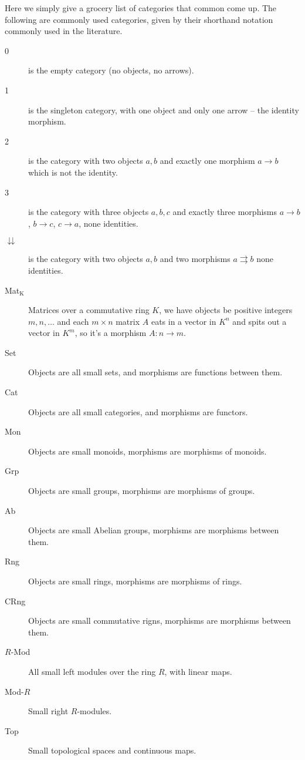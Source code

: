 Here we simply give a grocery list of categories that common come
up. The following are commonly used categories, given by their
shorthand notation commonly used in the literature.
\begin{description}
\item[0] is the empty category (no objects, no arrows).
\item[1] is the singleton category, with one object and only one
  arrow -- the identity morphism.
\item[2] is the category with two objects $a,b$ and exactly one
  morphism $a\to b$ which is not the identity.
\item[3] is the category with three objects $a,b,c$ and exactly
  three morphisms $a\to{}b$, $b\to{}c$, $c\to{}a$, none identities.
\item[$\downdownarrows$] is the category with two objects $a,b$ and
  two morphisms $a\rightrightarrows{}b$ none identities.
\item[Mat$_\text{K}$] Matrices over a commutative ring $K$, we
  have objects be positive integers $m,n,\ldots$ and each
  $m\times n$ matrix $A$ eats in a vector in $K^n$ and spits out
  a vector in $K^m$, so it's a morphism $A:n\to m$.
\item[Set] Objects are all small sets, and morphisms are
  functions between them.
\item[Cat] Objects are all small categories, and morphisms are
  functors.
\item[Mon] Objects are small monoids, morphisms are morphisms of monoids.
\item[Grp] Objects are small groups, morphisms are morphisms of groups.
\item[Ab] Objects are small Abelian groups, morphisms are
  morphisms between them.
\item[Rng] Objects are small rings, morphisms are morphisms of rings.
\item[CRng] Objects are small commutative rigns, morphisms are
  morphisms between them.
\item[$R$-Mod] All small left modules over the ring $R$, with
  linear maps.
\item[Mod-$R$] Small right $R$-modules.
\item[Top] Small topological spaces and continuous maps.
\end{description}
